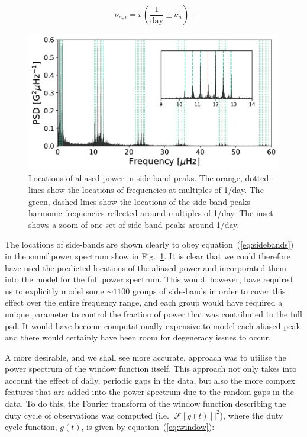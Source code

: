 \begin{equation}
\nu_{n, i} = i \, (\frac{1}{\mathrm{day}} \pm \nu_{n}) \, .
\label{eq:sidebands}
\end{equation}

\begin{figure}[ht!]
	\centering
	\includegraphics[width=\columnwidth]{sideband.pdf}
	\caption{Locations of aliased power in side-band peaks. The orange, dotted-lines show the locations of frequencies at multiples of 1/day. The green, dashed-lines show the locations of the side-band peaks -- harmonic frequencies reflected around multiples of 1/day.  The inset shows a zoom of one set of side-band peaks around 1/day.}
	\label{fig:sideband_locations}
\end{figure}


The locations of side-bands are shown clearly to obey equation~(\ref{eq:sidebands}) in the \gls{smmf} power spectrum show in Fig.~\ref{fig:sideband_locations}. It is clear that we could therefore have used the predicted locations of the aliased power and incorporated them into the model for the full power spectrum. This would, however, have required us to explicitly model some $\sim 1100$ groups of side-bands in order to cover this effect over the entire frequency range, and each group would have required a unique parameter to control the fraction of power that was contributed to the full \gls{psd}. It would have become computationally expensive to model each aliased peak and there would certainly have been room for degeneracy issues to occur.

A more desirable, and we shall see more accurate, approach was to utilise the power spectrum of the window function itself. This approach not only takes into account the effect of daily, periodic gaps in the data, but also the more complex features that are added into the power spectrum due to the random gaps in the data. To do this, the Fourier transform of the window function describing the duty cycle of observations was computed (i.e. $\left|\mathcal{F}\left[g(t)\right]\right|^2$), where the duty cycle function, $g(t)$, is given by equation~(\ref{eq:window}):

